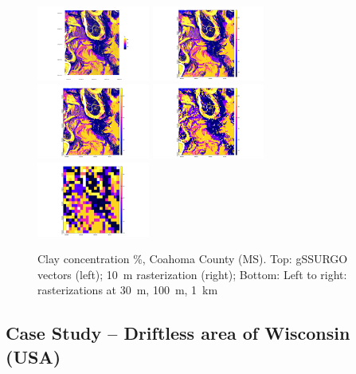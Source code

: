 \documentclass[soil, manuscript]{copernicus}
\begin{document}
\begin{figure}
  \hfill
  \includegraphics[width=0.33\textwidth]{gssurgo-vectors.png}
  \hfill
  \includegraphics[width=0.33\textwidth]{ggsurgo-to-raster-10m.png}
  \hfill
  \\
  \includegraphics[width=0.33\textwidth]{ggsurgo-to-raster-30m.png}
  \hfill
  \includegraphics[width=0.33\textwidth]{ggsurgo-to-raster-250m.png}
  \hfill
  \includegraphics[width=0.33\textwidth]{ggsurgo-to-raster-1km.png}
 \caption{Clay concentration \%, Coahoma County (MS). Top: gSSURGO vectors (left); 10~m rasterization (right); Bottom: Left to right: rasterizations at 30~m, 100~m, 1~km}
  \label{fig:coahoma_clay}
\end{figure}





\subsection{Case Study -- Driftless area of Wisconsin (USA)}
\end{document}
